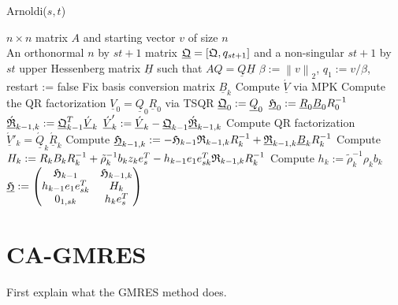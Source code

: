 \documentclass{scrartcl}
\numberwithin{equation}{section}
\newcommand{\norm}[1]{\left\lVert#1\right\rVert}
\begin{document}
\begin{algorithm}[H]
\caption{Arnoldi($s,t$)}
\label{alg:arnoldi(s,t)}
\begin{algorithmic}[1]
    \REQUIRE $n \times n$ matrix $A$ and starting vector $v$ of size $n$\\
    \ENSURE An orthonormal $n$ by $st + 1$ matrix $\underline{\frak{Q}} = \left[\frak{Q},q_{st + 1}\right]$ and a non-singular $st + 1$ by $st$ upper Hessenberg matrix $\underline{H}$ such that $AQ = \underline{Q} \underline{H}$
    \STATE $\beta := \norm{v}_2$, $q_1 := v/\beta$, restart := false
    	\STATE Fix basis conversion matrix $\underline{B}_k$
    	\STATE Compute $\underline{\acute{V}}$ via MPK
 	 		\STATE Compute the QR factorization $\underline{V}_0 = \underline{Q}_0 \underline{R}_0$ via TSQR
 	 	\STATE $\underline{\frak{Q}}_0 := \underline{Q}_0$
    	\STATE $\underline{\frak{H}}_0 := \underline{R}_0 \underline{B}_0 R_0^{-1}$
    	\ELSE
    		\STATE $\underline{\acute{\frak{R}}}_{k - 1, k} := \underline{\frak{Q}}^T_{k - 1} \underline{\acute{V}}_k$
    	\STATE $\underline{\acute{V}}_k' := \underline{\acute{V}}_k - \underline{\frak{Q}}_{k - 1} \underline{\acute{\frak{R}}}_{k - 1, k}$
    	\STATE Compute QR factorization $\underline{\acute{V}}'_k = \underline{\acute{Q}}_k \underline{\acute{R}}_k$
    	\STATE Compute $\underline{\frak{H}}_{k - 1, k} := - \frak{H}_{k - 1} \frak{R}_{k - 1, k} R^{-1}_k + \underline{\frak{R}}_{k - 1, k} \underline{B}_k R^{-1}_k$
		\STATE Compute $H_k := R_k B_k R^{-1}_k + \tilde{\rho}^{-1}_k b_k z_k e^T_s - h_{k-1} e_1 e^T_{sk} \frak{R}_{k-1,k} R^{-1}_k$
		\STATE Compute $h_k := \tilde{\rho}^{-1}_k \rho_k b_k$
    	\STATE $\underline{\frak{H}} : = 
    	\begin{pmatrix}
    		\frak{H}_{k - 1} & \frak{H}_{k - 1, k}\\
    		h_{k - 1} e_1 e_{sk}^T & H_k\\
    		0_{1,sk} & h_k e^T_s
    	\end{pmatrix}$
    	\ENDIF
	\ENDFOR
\end{algorithmic}
\end{algorithm}


\section{CA-GMRES} \label{sec:ca-gmres}
First explain what the GMRES method does.
\end{document}
